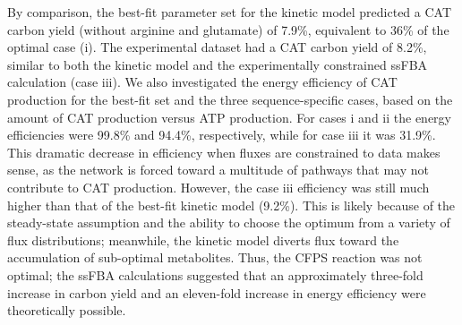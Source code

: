 \documentclass[12pt]{article}
\begin{document}
By comparison, the best-fit parameter set for the kinetic model predicted a CAT carbon yield (without arginine and glutamate) of 7.9\%, equivalent to 36\% of the optimal case (i).
The experimental dataset had a CAT carbon yield of 8.2\%, similar to both the kinetic model and the experimentally constrained ssFBA calculation (case iii).
We also investigated the energy efficiency of CAT production for the best-fit set and the three sequence-specific cases, based on the amount of CAT production versus ATP production.
For cases i and ii the energy efficiencies were 99.8\% and 94.4\%, respectively, while for case iii it was 31.9\%.
This dramatic decrease in efficiency when fluxes are constrained to data makes sense, as the network is forced toward a multitude of pathways that may not contribute to CAT production.
However, the case iii efficiency was still much higher than that of the best-fit kinetic model (9.2\%).
This is likely because of the steady-state assumption and the ability to choose the optimum from a variety of flux distributions; meanwhile, the kinetic model diverts flux toward the accumulation of sub-optimal metabolites.
Thus, the CFPS reaction was not optimal; the ssFBA calculations suggested that an approximately three-fold increase in carbon yield and an eleven-fold increase in energy efficiency were theoretically possible.
\end{document}
